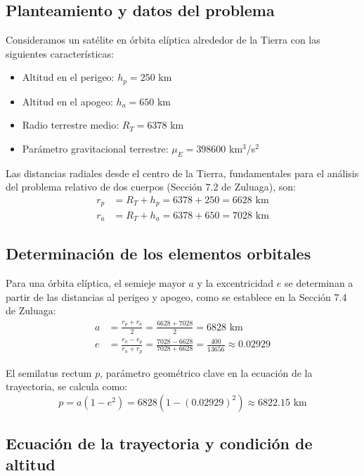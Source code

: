 \documentclass[12pt, a4paper]{article}
\begin{document}
\subsection*{Planteamiento y datos del problema}

Consideramos un satélite en órbita elíptica alrededor de la Tierra con las siguientes características:
\begin{itemize}
    \item Altitud en el perigeo: $h_p = 250$ km
    \item Altitud en el apogeo: $h_a = 650$ km
    \item Radio terrestre medio: $R_T = 6378$ km
    \item Parámetro gravitacional terrestre: $\mu_E = 398600$ km$^3$/s$^2$
\end{itemize}

Las distancias radiales desde el centro de la Tierra, fundamentales para el análisis del problema relativo de dos cuerpos (Sección 7.2 de Zuluaga), son:
\begin{align}
    r_p &= R_T + h_p = 6378 + 250 = 6628 \text{ km} \\
    r_a &= R_T + h_a = 6378 + 650 = 7028 \text{ km}
\end{align}

\subsection*{Determinación de los elementos orbitales}

Para una órbita elíptica, el semieje mayor $a$ y la excentricidad $e$ se determinan a partir de las distancias al perigeo y apogeo, como se establece en la Sección 7.4 de Zuluaga:
\begin{align}
    a &= \frac{r_p + r_a}{2} = \frac{6628 + 7028}{2} = 6828 \text{ km} \\
    e &= \frac{r_a - r_p}{r_a + r_p} = \frac{7028 - 6628}{7028 + 6628} = \frac{400}{13656} \approx 0.02929
\end{align}

El semilatus rectum $p$, parámetro geométrico clave en la ecuación de la trayectoria, se calcula como:
\begin{equation}
    p = a(1 - e^2) = 6828\left(1 - (0.02929)^2\right) \approx 6822.15 \text{ km}
\end{equation}

\subsection*{Ecuación de la trayectoria y condición de altitud}
\end{document}
